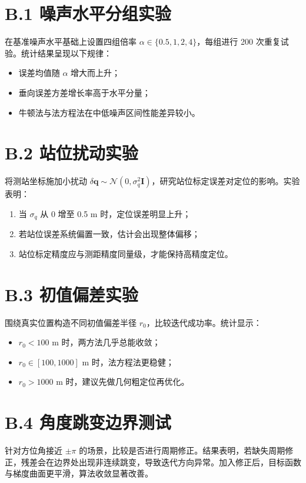 \section*{B.1 噪声水平分组实验}
在基准噪声水平基础上设置四组倍率 $\alpha\in\{0.5,1,2,4\}$，每组进行 200 次重复试验。统计结果呈现以下规律：
\begin{itemize}
  \item 误差均值随 $\alpha$ 增大而上升；
  \item 垂向误差方差增长率高于水平分量；
  \item 牛顿法与法方程法在中低噪声区间性能差异较小。
\end{itemize}

\section*{B.2 站位扰动实验}
将测站坐标施加小扰动 $\delta\bm q\sim\mathcal N(0,\sigma_q^2\bm I)$，研究站位标定误差对定位的影响。实验表明：
\begin{enumerate}
  \item 当 $\sigma_q$ 从 0 增至 0.5 m 时，定位误差明显上升；
  \item 若站位误差系统偏置一致，估计会出现整体偏移；
  \item 站位标定精度应与测距精度同量级，才能保持高精度定位。
\end{enumerate}

\section*{B.3 初值偏差实验}
围绕真实位置构造不同初值偏差半径 $r_0$，比较迭代成功率。统计显示：
\begin{itemize}
  \item $r_0<100$ m 时，两方法几乎总能收敛；
  \item $r_0\in[100,1000]$ m 时，法方程法更稳健；
  \item $r_0>1000$ m 时，建议先做几何粗定位再优化。
\end{itemize}

\section*{B.4 角度跳变边界测试}
针对方位角接近 $\pm\pi$ 的场景，比较是否进行周期修正。结果表明，若缺失周期修正，残差会在边界处出现非连续跳变，导致迭代方向异常。加入修正后，目标函数与梯度曲面更平滑，算法收敛显著改善。

